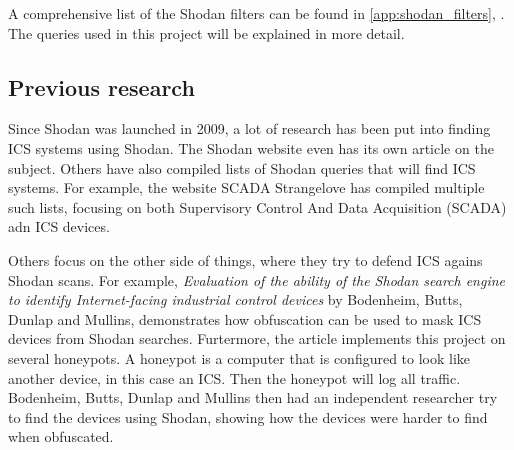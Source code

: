 A comprehensive list of the Shodan filters can be found in \cref{app:shodan_filters}, . The queries used in this project will be explained in more detail. 

\subsection{Previous research}
Since Shodan was launched in 2009, a lot of research has been put into finding ICS systems using Shodan. The Shodan website even has its own article on the subject.\cite{shodan_ics}  Others have also compiled lists of Shodan queries that will find ICS systems. For example, the website SCADA Strangelove has compiled multiple such lists, focusing on both Supervisory Control And Data Acquisition (SCADA) adn ICS devices.\cite{scadasl_cheatsheet} \cite{scadasl_shodan}

Others focus on the other side of things, where they try to defend ICS agains Shodan scans. For example, \textit{Evaluation of the ability of the Shodan search engine to identify Internet-facing industrial control devices} by Bodenheim, Butts, Dunlap and Mullins, \cite{bodenheim_butts_dunlap_mullins_2014} demonstrates how obfuscation can be used to mask ICS devices from Shodan searches. Furtermore, the article implements this project on several honeypots. A honeypot is a computer that is configured to look like another device, in this case an ICS. Then the honeypot will log all traffic. Bodenheim, Butts, Dunlap and Mullins then had an independent researcher try to find the devices using Shodan, showing how the devices were harder to find when obfuscated.

\newpage

